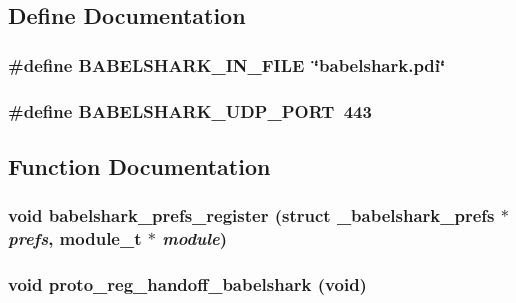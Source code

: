 \subsection{Define Documentation}
\hypertarget{packet-babelshark_8h_a74d255116acf8751ee04f315292cb7e}{
\subsubsection[{BABELSHARK\_\-IN\_\-FILE}]{\setlength{\rightskip}{0pt plus 5cm}\#define BABELSHARK\_\-IN\_\-FILE~\char`\"{}babelshark.pdi\char`\"{}}}
\label{packet-babelshark_8h_a74d255116acf8751ee04f315292cb7e}


\hypertarget{packet-babelshark_8h_2d89c0d071de8d92c8eb4fe1f6541409}{
\subsubsection[{BABELSHARK\_\-UDP\_\-PORT}]{\setlength{\rightskip}{0pt plus 5cm}\#define BABELSHARK\_\-UDP\_\-PORT~443}}
\label{packet-babelshark_8h_2d89c0d071de8d92c8eb4fe1f6541409}




\subsection{Function Documentation}
\hypertarget{packet-babelshark_8h_a7da879121dfba7477ae8adae7edf144}{
\subsubsection[{babelshark\_\-prefs\_\-register}]{\setlength{\rightskip}{0pt plus 5cm}void babelshark\_\-prefs\_\-register (struct {\bf \_\-babelshark\_\-prefs} $\ast$ {\em prefs}, \/  module\_\-t $\ast$ {\em module})}}
\label{packet-babelshark_8h_a7da879121dfba7477ae8adae7edf144}


\hypertarget{packet-babelshark_8h_05f79f4658db9ccfb4172678458b2d21}{
\subsubsection[{proto\_\-reg\_\-handoff\_\-babelshark}]{\setlength{\rightskip}{0pt plus 5cm}void proto\_\-reg\_\-handoff\_\-babelshark (void)}}
\label{packet-babelshark_8h_05f79f4658db9ccfb4172678458b2d21}


